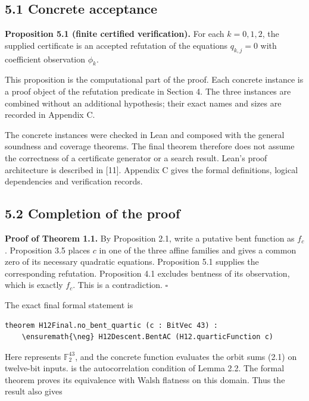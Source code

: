 \documentclass[11pt,a4paper]{article}
\begin{document}
\subsection*{5.1 Concrete acceptance}

\textbf{Proposition 5.1 (finite certified verification).} For each $k=0,1,2$, the supplied certificate is an accepted refutation of the equations $q_{k,j}=0$ with coefficient observation $\phi_k$.

This proposition is the computational part of the proof. Each concrete instance is a proof object of the refutation predicate in Section 4. The three instances are combined without an additional hypothesis; their exact names and sizes are recorded in Appendix C.

The concrete instances were checked in Lean and composed with the general soundness and coverage theorems. The final theorem therefore does not assume the correctness of a certificate generator or a search result. Lean's proof architecture is described in [11]. Appendix C gives the formal definitions, logical dependencies and verification records.

\subsection*{5.2 Completion of the proof}

\textbf{Proof of Theorem 1.1.} By Proposition 2.1, write a putative bent function as $f_c$. Proposition 3.5 places $c$ in one of the three affine families and gives a common zero of its necessary quadratic equations. Proposition 5.1 supplies the corresponding refutation. Proposition 4.1 excludes bentness of its observation, which is exactly $f_c$. This is a contradiction. \hfill$\square$

The exact final formal statement is

\begin{Verbatim}[fontsize=\scriptsize,breaklines=true,breakanywhere=true,commandchars=\\\{\}]
theorem H12Final.no_bent_quartic (c : BitVec 43) :
    \ensuremath{\neg} H12Descent.BentAC (H12.quarticFunction c)
\end{Verbatim}

Here  represents $\mathbb F_2^{43}$, and the concrete function evaluates the orbit sums (2.1) on twelve-bit inputs.  is the autocorrelation condition of Lemma 2.2. The formal theorem  proves its equivalence with Walsh flatness on this domain. Thus the result also gives
\end{document}
